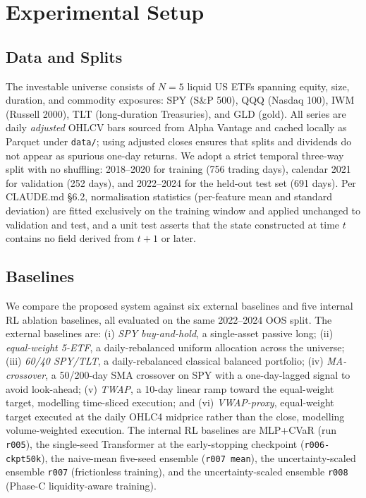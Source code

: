 \documentclass[conference]{IEEEtran}
\begin{document}
\section{Experimental Setup}
\label{sec:setup}

\subsection{Data and Splits}
\label{sec:setup:data}
The investable universe consists of $N{=}5$ liquid US ETFs spanning equity,
size, duration, and commodity exposures: SPY (S\&P 500), QQQ (Nasdaq 100),
IWM (Russell 2000), TLT (long-duration Treasuries), and GLD (gold). All
series are daily \emph{adjusted} OHLCV bars sourced from Alpha Vantage and
cached locally as Parquet under \texttt{data/}; using adjusted closes
ensures that splits and dividends do not appear as spurious one-day
returns. We adopt a strict temporal three-way split with no shuffling:
2018--2020 for training (756 trading days), calendar 2021 for validation
(252 days), and 2022--2024 for the held-out test set (691 days). Per
CLAUDE.md \S6.2, normalisation statistics (per-feature mean and standard
deviation) are fitted exclusively on the training window and applied
unchanged to validation and test, and a unit test asserts that the state
constructed at time $t$ contains no field derived from $t{+}1$ or later.

\subsection{Baselines}
\label{sec:setup:baselines}
We compare the proposed system against six external baselines and five
internal RL ablation baselines, all evaluated on the same 2022--2024 OOS
split. The external baselines are:
(i) \emph{SPY buy-and-hold}, a single-asset passive long;
(ii) \emph{equal-weight 5-ETF}, a daily-rebalanced uniform allocation
across the universe;
(iii) \emph{60/40 SPY/TLT}, a daily-rebalanced classical balanced
portfolio;
(iv) \emph{MA-crossover}, a 50/200-day SMA crossover on SPY with a
one-day-lagged signal to avoid look-ahead;
(v) \emph{TWAP}, a 10-day linear ramp toward the equal-weight target,
modelling time-sliced execution; and
(vi) \emph{VWAP-proxy}, equal-weight target executed at the daily OHLC4
midprice rather than the close, modelling volume-weighted execution.
The internal RL baselines are MLP+CVaR (run \texttt{r005}), the
single-seed Transformer at the early-stopping checkpoint
(\texttt{r006-ckpt50k}), the naive-mean five-seed ensemble
(\texttt{r007 mean}), the uncertainty-scaled ensemble \texttt{r007}
(frictionless training), and the uncertainty-scaled ensemble
\texttt{r008} (Phase-C liquidity-aware training).
\end{document}
